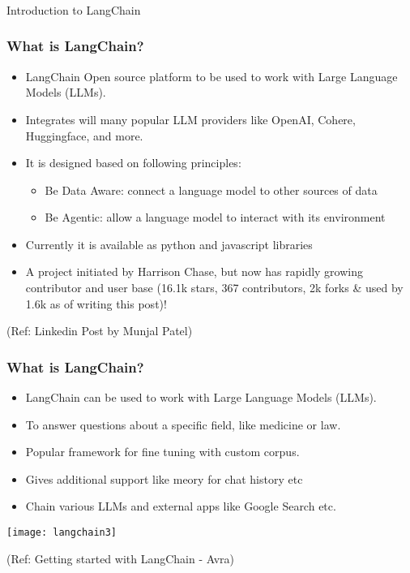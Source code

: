\begin{frame}[fragile]\frametitle{}
\begin{center}
{\Large Introduction to LangChain}
\end{center}
\end{frame}

\begin{frame}\frametitle{What is LangChain?}

\begin{itemize}
\item LangChain Open source platform to be used to work with Large Language Models (LLMs). 
\item Integrates will many popular LLM providers like OpenAI, Cohere, Huggingface, and more.  
\item It is designed based on following principles:
	\begin{itemize}
	\item Be Data Aware: connect a language model to other sources of data
	\item Be Agentic: allow a language model to interact with its environment
	\end{itemize}
\item Currently it is available as python and javascript libraries
\item A project initiated by Harrison Chase, but now has rapidly growing contributor and user base (16.1k stars, 367 contributors, 2k forks \& used by 1.6k as of writing this post)!
\end{itemize}

{\tiny (Ref: Linkedin Post by Munjal Patel)}
\end{frame}

\begin{frame}\frametitle{What is LangChain?}

\begin{itemize}
\item LangChain can be used to work with Large Language Models (LLMs). 
\item To answer questions about a specific field, like medicine or law. 
\item Popular framework for fine tuning with custom corpus.
\item Gives additional support like meory for chat history etc
\item Chain various LLMs and external apps like Google Search etc.
\end{itemize}

\begin{center}
\texttt{[image: langchain3]}
\end{center}	  


{\tiny (Ref: Getting started with LangChain - Avra)}
\end{frame}


